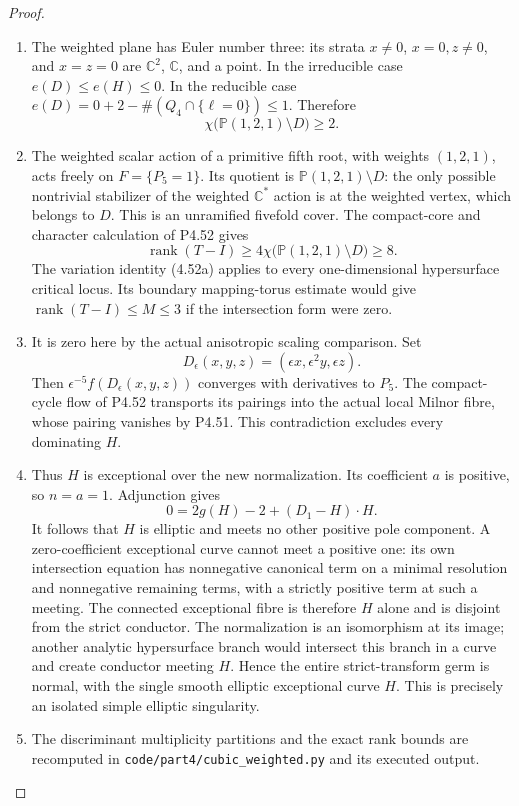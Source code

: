 \begin{proof}
\begin{enumerate}[label={$\langle1\rangle$\arabic*.},leftmargin=*]
\item The weighted plane has Euler number three: its
strata $x\ne0$, $x=0,z\ne0$, and $x=z=0$ are
$\mathbb C^2$, $\mathbb C$, and a point.
In the irreducible case $e(D)\le e(H)\le0$.
In the reducible case
$e(D)=0+2-\#(Q_4\cap\{\ell=0\})\le1$.
Therefore
\[
               \chi\bigl(\mathbb P(1,2,1)\setminus D\bigr)
                         \ge2.                            \tag{4.53e}
\]

\item The weighted scalar action of a primitive fifth
root, with weights $(1,2,1)$, acts freely on
$F=\{P_5=1\}$. Its quotient is
$\mathbb P(1,2,1)\setminus D$: the only possible
nontrivial stabilizer of the weighted
$\mathbb C^*$ action is at the weighted vertex,
which belongs to $D$. This is an unramified
fivefold cover. The compact-core and character
calculation of P4.52 gives
\[
 \operatorname{rank}(T-I)
 \ge4\chi\bigl(\mathbb P(1,2,1)\setminus D\bigr)
 \ge8.
\]
The variation identity (4.52a) applies to every
one-dimensional hypersurface critical locus. Its
boundary mapping-torus estimate would give
$\operatorname{rank}(T-I)\le M\le3$ if the
intersection form were zero.

\item It is zero here by the actual anisotropic scaling
comparison. Set
\[
 D_\epsilon(x,y,z)=(\epsilon x,\epsilon^2y,\epsilon z).
\]
Then $\epsilon^{-5}f(D_\epsilon(x,y,z))$ converges
with derivatives to $P_5$. The compact-cycle flow
of P4.52 transports its pairings into the actual
local Milnor fibre, whose pairing vanishes by
P4.51. This contradiction excludes every dominating
$H$.

\item Thus $H$ is exceptional over the new normalization.
Its coefficient $a$ is positive, so $n=a=1$.
Adjunction gives
\[
                    0=2g(H)-2+(D_1-H)\cdot H.
\]
It follows that $H$ is elliptic and meets no other
positive pole component. A zero-coefficient
exceptional curve cannot meet a positive one:
its own intersection equation has nonnegative
canonical term on a minimal resolution and
nonnegative remaining terms, with a strictly
positive term at such a meeting. The connected
exceptional fibre is therefore $H$ alone and is
disjoint from the strict conductor. The
normalization is an isomorphism at its image;
another analytic hypersurface branch would
intersect this branch in a curve and create
conductor meeting $H$. Hence the entire
strict-transform germ is normal, with the single
smooth elliptic exceptional curve $H$. This is
precisely an isolated simple elliptic singularity.

\item The discriminant multiplicity partitions and the
exact rank bounds are recomputed in
\texttt{code/part4/cubic\_weighted.py} and its
executed output.

\end{enumerate}
\end{proof}
